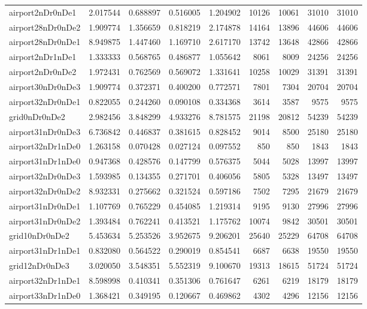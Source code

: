 \begin{longtable}{|l|r|r|r|r|r|r|r|r|}
airport2nDr0nDe1 & 2.017544 & 0.688897 & 0.516005 & 1.204902 & 10126 & 10061 & 31010 & 31010 \\
airport28nDr0nDe2 & 1.909774 & 1.356659 & 0.818219 & 2.174878 & 14164 & 13896 & 44606 & 44606 \\
airport28nDr0nDe1 & 8.949875 & 1.447460 & 1.169710 & 2.617170 & 13742 & 13648 & 42866 & 42866 \\
airport2nDr1nDe1 & 1.333333 & 0.568765 & 0.486877 & 1.055642 & 8061 & 8009 & 24256 & 24256 \\
airport2nDr0nDe2 & 1.972431 & 0.762569 & 0.569072 & 1.331641 & 10258 & 10029 & 31391 & 31391 \\
airport30nDr0nDe3 & 1.909774 & 0.372371 & 0.400200 & 0.772571 & 7801 & 7304 & 20704 & 20704 \\
airport32nDr0nDe1 & 0.822055 & 0.244260 & 0.090108 & 0.334368 & 3614 & 3587 & 9575 & 9575 \\
grid0nDr0nDe2 & 2.982456 & 3.848299 & 4.933276 & 8.781575 & 21198 & 20812 & 54239 & 54239 \\
airport31nDr0nDe3 & 6.736842 & 0.446837 & 0.381615 & 0.828452 & 9014 & 8500 & 25180 & 25180 \\
airport32nDr1nDe0 & 1.263158 & 0.070428 & 0.027124 & 0.097552 & 850 & 850 & 1843 & 1843 \\
airport31nDr1nDe0 & 0.947368 & 0.428576 & 0.147799 & 0.576375 & 5044 & 5028 & 13997 & 13997 \\
airport32nDr0nDe3 & 1.593985 & 0.134355 & 0.271701 & 0.406056 & 5805 & 5328 & 13497 & 13497 \\
airport32nDr0nDe2 & 8.932331 & 0.275662 & 0.321524 & 0.597186 & 7502 & 7295 & 21679 & 21679 \\
airport31nDr0nDe1 & 1.107769 & 0.765229 & 0.454085 & 1.219314 & 9195 & 9130 & 27996 & 27996 \\
airport31nDr0nDe2 & 1.393484 & 0.762241 & 0.413521 & 1.175762 & 10074 & 9842 & 30501 & 30501 \\
grid10nDr0nDe2 & 5.453634 & 5.253526 & 3.952675 & 9.206201 & 25640 & 25229 & 64708 & 64708 \\
airport31nDr1nDe1 & 0.832080 & 0.564522 & 0.290019 & 0.854541 & 6687 & 6638 & 19550 & 19550 \\
grid12nDr0nDe3 & 3.020050 & 3.548351 & 5.552319 & 9.100670 & 19313 & 18615 & 51724 & 51724 \\
airport32nDr1nDe1 & 8.598998 & 0.410341 & 0.351306 & 0.761647 & 6261 & 6219 & 18179 & 18179 \\
airport33nDr1nDe0 & 1.368421 & 0.349195 & 0.120667 & 0.469862 & 4302 & 4296 & 12156 & 12156 \\

\end{longtable}
